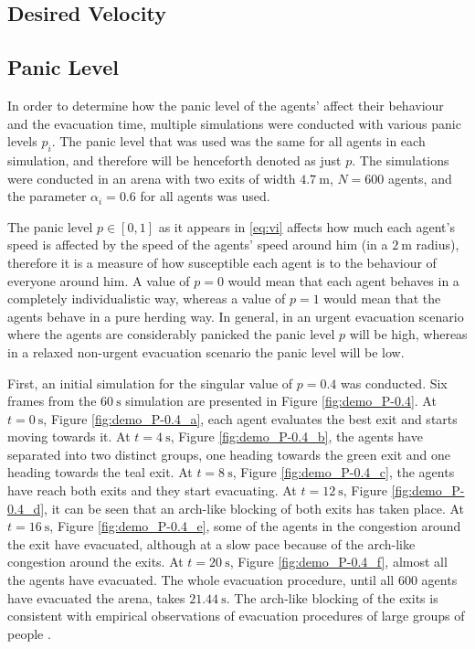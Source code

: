 \subsection{Desired Velocity} \label{sec:6.1-velocity}


\subsection{Panic Level} \label{sec:6.2-panic}
In order to determine how the panic level of the agents' affect their behaviour and the evacuation time, multiple simulations were conducted with various panic levels $p_i$. The panic level that was used was the same for all agents in each simulation, and therefore will be henceforth denoted as just $p$. The simulations were conducted in an arena with two exits of width $\SI{4.7}{\meter}$, $N=600$ agents, and the parameter $\alpha_i=0.6$ for all agents was used.

The panic level $p \in [0,1]$ as it appears in \eqref{eq:vi} affects how much each agent's speed is affected by the speed of the agents' speed around him (in a $\SI{2}{\meter}$ radius), therefore it is a measure of how susceptible each agent is to the behaviour of everyone around him. A value of $p=0$ would mean that each agent behaves in a completely individualistic way, whereas a value of $p=1$ would mean that the agents behave in a pure herding way. In general, in an urgent evacuation scenario where the agents are considerably panicked the panic level $p$ will be high, whereas in a relaxed non-urgent evacuation scenario the panic level will be low.

First, an initial simulation for the singular value of $p = 0.4$ was conducted. Six frames from the $\SI{60}{\second}$ simulation are presented in Figure \ref{fig:demo_P-0.4}. At $t=\SI{0}{\second}$, Figure \ref{fig:demo_P-0.4_a}, each agent evaluates the best exit and starts moving towards it. At $t=\SI{4}{\second}$, Figure \ref{fig:demo_P-0.4_b}, the agents have separated into two distinct groups, one heading towards the green exit and one heading towards the teal exit. At $t=\SI{8}{\second}$, Figure \ref{fig:demo_P-0.4_c}, the agents have reach both exits and they start evacuating. At $t=\SI{12}{\second}$, Figure \ref{fig:demo_P-0.4_d}, it can be seen that an arch-like blocking of both exits has taken place. At $t=\SI{16}{\second}$, Figure \ref{fig:demo_P-0.4_e}, some of the agents in the congestion around the exit have evacuated, although at a slow pace because of the arch-like congestion around the exits. At $t=\SI{20}{\second}$, Figure \ref{fig:demo_P-0.4_f}, almost all the agents have evacuated. The whole evacuation procedure, until all $600$ agents have evacuated the arena, takes $\SI{21.44}{\second}$. The arch-like blocking of the exits is consistent with empirical observations of evacuation procedures of large groups of people \cite{Helbing2000}.


